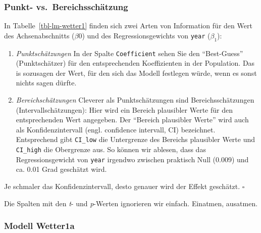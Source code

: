 \documentclass[
  letterpaper,
  oneside,
  open=any]{scrbook}
\theoremstyle{definition}
\theoremstyle{definition}
\theoremstyle{definition}
\theoremstyle{remark}
\begin{document}
\subsubsection{Punkt-
vs.~Bereichsschätzung}\label{punkt--vs.-bereichsschuxe4tzung}

In Tabelle~\ref{tbl-lm-wetter1} finden sich zwei Arten von Information
für den Wert des Achsenabschnitts (\(\beta 0\)) und des
Regressionsgewichts von \texttt{year} (\(\beta _1\)):

\begin{enumerate}
\def\labelenumi{\arabic{enumi}.}
\item
  \emph{Punktschätzungen} In der Spalte \texttt{Coefficient} sehen Sie
  den \enquote{Best-Guess} (Punktschätzer) für den entsprechenden
  Koeffizienten in der Population. Das is sozusagen der Wert, für den
  sich das Modell festlegen würde, wenn es sonst nichts sagen dürfte.
\item
  \emph{Bereichschätzungen} Cleverer als Punktschätzungen sind
  Bereichsschätzungen (Intervallschätzungen): Hier wird ein Bereich
  plausibler Werte für den entsprechenden Wert angegeben. Der
  \enquote{Bereich plausibler Werte} wird auch als Konfidenzintervall
  (engl. confidence intervall, CI) bezeichnet. Entsprechend gibt
  \texttt{CI\_low} die Untergrenze des Bereichs plausibler Werte und
  \texttt{CI\_high} die Obergrenze aus. So können wir ablesen, dass das
  Regressionsgewicht von \texttt{year} irgendwo zwischen praktisch Null
  (0.009) und ca. 0.01 Grad geschätzt wird.
\end{enumerate}

\begin{tcolorbox}[enhanced jigsaw, bottomrule=.15mm, left=2mm, colbacktitle=quarto-callout-important-color!10!white, bottomtitle=1mm, colframe=quarto-callout-important-color-frame, coltitle=black, rightrule=.15mm, breakable, toptitle=1mm, titlerule=0mm, title=\textcolor{quarto-callout-important-color}{\faExclamation}\hspace{0.5em}{Wichtig}, opacitybacktitle=0.6, arc=.35mm, colback=white, leftrule=.75mm, opacityback=0, toprule=.15mm]

Je schmaler das Konfidenzintervall, desto genauer wird der Effekt
geschätzt. \(\square\)

\end{tcolorbox}

Die Spalten mit den \emph{t}- und \emph{p}-Werten ignorieren wir
einfach. Einatmen, ausatmen.

\subsubsection{Modell Wetter1a}\label{modell-wetter1a}
\end{document}
